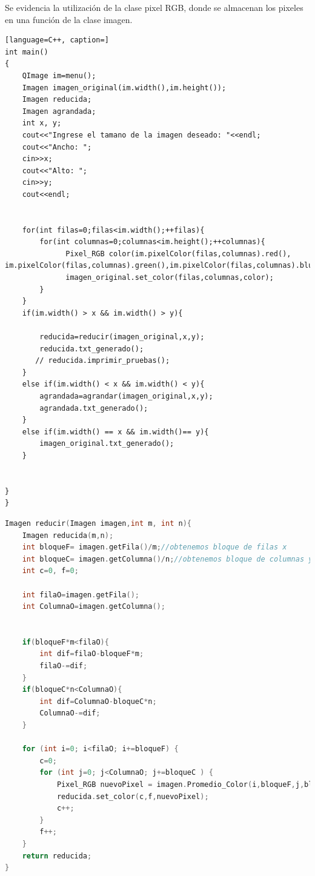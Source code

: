 \documentclass{article}
\begin{document}
Se evidencia la utilización de la clase pixel RGB, donde se almacenan los pixeles en una función de la clase imagen.
\begin{lstlisting}[language=C++, caption=]
int main()
{
    QImage im=menu();
    Imagen imagen_original(im.width(),im.height());
    Imagen reducida;
    Imagen agrandada;
    int x, y;
    cout<<"Ingrese el tamano de la imagen deseado: "<<endl;
    cout<<"Ancho: ";
    cin>>x;
    cout<<"Alto: ";
    cin>>y;
    cout<<endl;


    for(int filas=0;filas<im.width();++filas){
        for(int columnas=0;columnas<im.height();++columnas){
              Pixel_RGB color(im.pixelColor(filas,columnas).red(), im.pixelColor(filas,columnas).green(),im.pixelColor(filas,columnas).blue());
              imagen_original.set_color(filas,columnas,color);
        }
    }
    if(im.width() > x && im.width() > y){

        reducida=reducir(imagen_original,x,y);
        reducida.txt_generado();
       // reducida.imprimir_pruebas();
    }
    else if(im.width() < x && im.width() < y){
        agrandada=agrandar(imagen_original,x,y);
        agrandada.txt_generado();
    }
    else if(im.width() == x && im.width()== y){
        imagen_original.txt_generado();
    }


}
}
\end{lstlisting}
\begin{lstlisting}[language=C++, caption=funcion para reducir]
Imagen reducir(Imagen imagen,int m, int n){
    Imagen reducida(m,n);
    int bloqueF= imagen.getFila()/m;//obtenemos bloque de filas x
    int bloqueC= imagen.getColumna()/n;//obtenemos bloque de columnas y
    int c=0, f=0;

    int filaO=imagen.getFila();
    int ColumnaO=imagen.getColumna();


    if(bloqueF*m<filaO){
        int dif=filaO-bloqueF*m;
        filaO-=dif;
    }
    if(bloqueC*n<ColumnaO){
        int dif=ColumnaO-bloqueC*n;
        ColumnaO-=dif;
    }

    for (int i=0; i<filaO; i+=bloqueF) {
        c=0;
        for (int j=0; j<ColumnaO; j+=bloqueC ) {
            Pixel_RGB nuevoPixel = imagen.Promedio_Color(i,bloqueF,j,bloqueC);
            reducida.set_color(c,f,nuevoPixel);
            c++;
        }
        f++;
    }
    return reducida;
}
\end{lstlisting}
\end{document}
